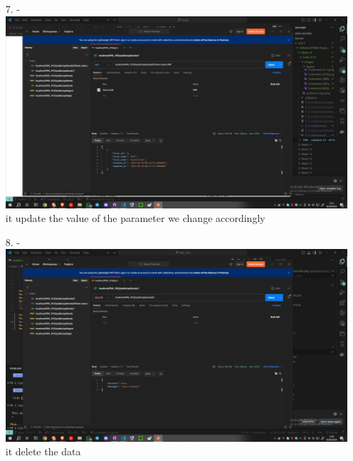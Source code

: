 \documentclass[12pt,titlepage]{article}
\begin{document}
\begin{enumerate}
    \item[7.] - \\ \includegraphics[width=.9\textwidth]{images/figures/Screenshot (483).png} \\ it update the value of the parameter we change accordingly
    \item[8.] - \\ \includegraphics[width=.9\textwidth]{images/figures/Screenshot (484).png} \\ it delete the data
\end{enumerate}
\end{document}
